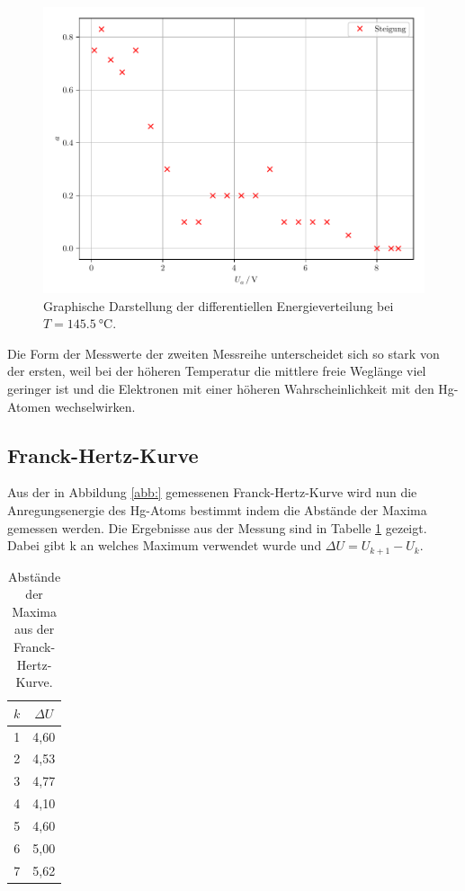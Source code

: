 \begin{figure}[H]
  \includegraphics[width=\textwidth]{plot2.pdf}
  \caption{Graphische Darstellung der differentiellen Energieverteilung bei $T = \SI{145.5}{\celsius}$.}
  \label{abb:4}
\end{figure}

Die Form der Messwerte der zweiten Messreihe unterscheidet sich so stark von der
ersten, weil bei der höheren Temperatur die mittlere freie Weglänge viel geringer ist
und die Elektronen mit einer höheren Wahrscheinlichkeit mit den Hg-Atomen wechselwirken.

\subsection{Franck-Hertz-Kurve}
Aus der in Abbildung \ref{abb:} gemessenen Franck-Hertz-Kurve wird nun die Anregungsenergie
des Hg-Atoms bestimmt indem die Abstände der Maxima gemessen werden. Die Ergebnisse
aus der Messung sind in Tabelle \ref{tab:4} gezeigt. Dabei gibt k an welches Maximum verwendet
wurde und $\Delta U = U_{k+1}-U_k$.

\begin{table}[H]
  \centering
  \caption{Abstände der Maxima aus der Franck-Hertz-Kurve.}
  \label{tab:4}
  \begin{tabular}{c c}
    \toprule
    $k$ & $\Delta U$ \\
    \midrule
    1 & 4,60 \\
    2 & 4,53 \\
    3 & 4,77 \\
    4 & 4,10 \\
    5 & 4,60 \\
    6 & 5,00 \\
    7 & 5,62 \\
    \bottomrule
  \end{tabular}
\end{table}

